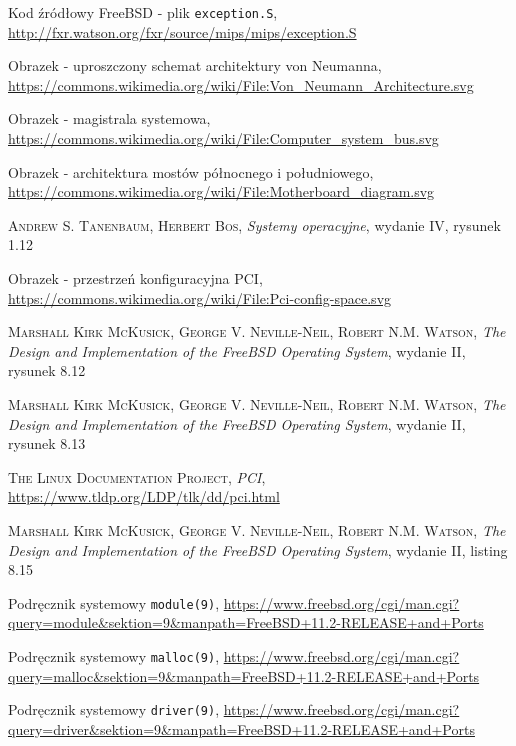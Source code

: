 \documentclass[shortabstract,inz]{iithesis}
\begin{document}
\begin{thebibliography}{1}
 Kod źródłowy FreeBSD - plik \texttt{exception.S},
\url{http://fxr.watson.org/fxr/source/mips/mips/exception.S}

 Obrazek - uproszczony schemat architektury von Neumanna,
\url{https://commons.wikimedia.org/wiki/File:Von_Neumann_Architecture.svg}

 Obrazek - magistrala systemowa,
\url{https://commons.wikimedia.org/wiki/File:Computer_system_bus.svg}

 Obrazek - architektura mostów północnego i południowego,
\url{https://commons.wikimedia.org/wiki/File:Motherboard_diagram.svg}

 \textsc{Andrew S. Tanenbaum, Herbert Bos},
\textit{Systemy operacyjne}, wydanie IV, rysunek 1.12

 Obrazek - przestrzeń konfiguracyjna PCI,
\url{https://commons.wikimedia.org/wiki/File:Pci-config-space.svg}

 \textsc{Marshall Kirk McKusick, George V. Neville-Neil, Robert N.M. Watson},
\textit{The Design and Implementation of the FreeBSD Operating System},
wydanie II, rysunek 8.12

 \textsc{Marshall Kirk McKusick, George V. Neville-Neil, Robert N.M. Watson},
\textit{The Design and Implementation of the FreeBSD Operating System},
wydanie II, rysunek 8.13

 \textsc{The Linux Documentation Project}, \textit{PCI},
\url{https://www.tldp.org/LDP/tlk/dd/pci.html}


 \textsc{Marshall Kirk McKusick, George V. Neville-Neil, Robert N.M. Watson},
\textit{The Design and Implementation of the FreeBSD Operating System},
wydanie II, listing 8.15



 Podręcznik systemowy \texttt{module(9)},
\url{https://www.freebsd.org/cgi/man.cgi?query=module&sektion=9&manpath=FreeBSD+11.2-RELEASE+and+Ports}

 Podręcznik systemowy \texttt{malloc(9)},
\url{https://www.freebsd.org/cgi/man.cgi?query=malloc&sektion=9&manpath=FreeBSD+11.2-RELEASE+and+Ports}

 Podręcznik systemowy \texttt{driver(9)},
\url{https://www.freebsd.org/cgi/man.cgi?query=driver&sektion=9&manpath=FreeBSD+11.2-RELEASE+and+Ports}


\end{thebibliography}
\end{document}
